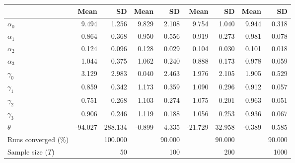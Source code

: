 
\begin{tabular}[t]{lrrrrrrrr}
\toprule
  & Mean & SD & Mean  & SD  & Mean   & SD   & Mean    & SD   \\
\midrule
$\alpha_{0}$ & 9.494 & 1.256 & 9.829 & 2.108 & 9.754 & 1.040 & 9.944 & 0.318\\
$\alpha_{1}$ & 0.864 & 0.368 & 0.950 & 0.556 & 0.919 & 0.273 & 0.981 & 0.078\\
$\alpha_{2}$ & 0.124 & 0.096 & 0.128 & 0.029 & 0.104 & 0.030 & 0.101 & 0.018\\
$\alpha_{3}$ & 1.044 & 0.375 & 1.062 & 0.240 & 0.888 & 0.173 & 0.978 & 0.059\\
$\gamma_{0}$ & 3.129 & 2.983 & 0.040 & 2.463 & 1.976 & 2.105 & 1.905 & 0.529\\
$\gamma_{1}$ & 0.859 & 0.342 & 1.173 & 0.359 & 1.090 & 0.296 & 0.912 & 0.057\\
$\gamma_{2}$ & 0.751 & 0.268 & 1.103 & 0.274 & 1.075 & 0.201 & 0.963 & 0.051\\
$\gamma_{3}$ & 0.906 & 0.246 & 1.119 & 0.188 & 1.056 & 0.253 & 0.936 & 0.067\\
$\theta$ & -94.027 & 288.134 & -0.899 & 4.335 & -21.729 & 32.958 & -0.389 & 0.585\\
Runs converged (\%) &  & 100.000 &  & 90.000 &  & 90.000 &  & 90.000\\
Sample size ($T$) &  & 50 &  & 100 &  & 200 &  & 1000\\
\bottomrule
\end{tabular}
